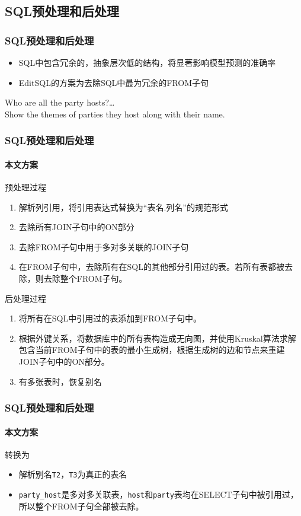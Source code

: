 \documentclass{ctexbeamer}
\begin{document}
\subsection{SQL预处理和后处理}
\begin{frame}
  \frametitle{SQL预处理和后处理}
  \begin{itemize}
    \item SQL中包含冗余的，抽象层次低的结构，将显著影响模型预测的准确率
    \item EditSQL的方案为去除SQL中最为冗余的FROM子句
  \end{itemize}
  \begin{example}
    Who are all the party hosts?…\\
    Show the themes of parties they host along with their name.

    \vspace{0.2cm}
    
  \end{example}
\end{frame}
\begin{frame}
  \frametitle{SQL预处理和后处理}
  \framesubtitle{本文方案}
  预处理过程
  \begin{enumerate}
    \item 解析列引用，将引用表达式替换为“表名.列名”的规范形式
    \item 去除所有JOIN子句中的ON部分
    \item 去除FROM子句中用于多对多关联的JOIN子句
    \item 在FROM子句中，去除所有在SQL的其他部分引用过的表。若所有表都被去除，则去除整个FROM子句。
  \end{enumerate}
  后处理过程
  \begin{enumerate}
    \item 将所有在SQL中引用过的表添加到FROM子句中。
    \item 根据外键关系，将数据库中的所有表构造成无向图，并使用Kruskal算法求解包含当前FROM子句中的表的最小生成树，根据生成树的边和节点来重建JOIN子句中的ON部分。
    \item 有多张表时，恢复别名
  \end{enumerate}
\end{frame}
\begin{frame}
  \frametitle{SQL预处理和后处理}
  \framesubtitle{本文方案}
  \begin{example}
    

    转换为

    
  \end{example}
  \begin{itemize}
    \item 解析别名\texttt{T2}，\texttt{T3}为真正的表名
    \item \texttt{party\_host}是多对多关联表，\texttt{host}和\texttt{party}表均在SELECT子句中被引用过，所以整个FROM子句全部被去除。
  \end{itemize}
\end{frame}
\end{document}

